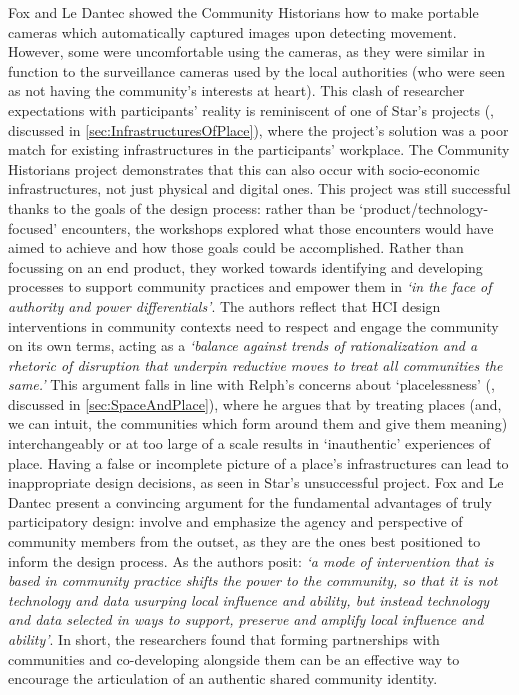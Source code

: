 Fox and Le Dantec showed the Community Historians how to make portable cameras which automatically captured images upon detecting movement. However, some were uncomfortable using the cameras, as they were similar in function to the surveillance cameras used by the local authorities (who were seen as not having the community's interests at heart). This clash of researcher expectations with participants' reality is reminiscent of one of Star's projects (\cite{Star1999}, discussed in \ref{sec:InfrastructuresOfPlace}), where the project's solution was a poor match for existing infrastructures in the participants' workplace. The Community Historians project demonstrates that this can also occur with socio-economic infrastructures, not just physical and digital ones. This project was still successful thanks to the goals of the design process: rather than be `product/technology-focused' encounters, the workshops explored what those encounters would have aimed to achieve and how those goals could be accomplished. Rather than focussing on an end product, they worked towards identifying and developing processes to support community practices and empower them in \textit{`in the face of authority and power differentials'}. The authors reflect that HCI design interventions in community contexts need to respect and engage the community on its own terms, acting as a \textit{`balance against trends of rationalization and a rhetoric of disruption that underpin reductive moves to treat all communities the same.'} This argument falls in line with Relph's concerns about `placelessness' (\cite{Relph1976}, discussed in \ref{sec:SpaceAndPlace}), where he argues that by treating places (and, we can intuit, the communities which form around them and give them meaning) interchangeably or at too large of a scale results in `inauthentic' experiences of place. Having a false or incomplete picture of a place's infrastructures can lead to inappropriate design decisions, as seen in Star's unsuccessful project. Fox and Le Dantec present a convincing argument for the fundamental advantages of truly participatory design: involve and emphasize the agency and perspective of community members from the outset, as they are the ones best positioned to inform the design process. As the authors posit: \textit{`a mode of intervention that is based in community practice shifts the power to the community, so that it is not technology and data usurping local influence and ability, but instead technology and data selected in ways to support, preserve and amplify local influence and ability'}. In short, the researchers found that forming partnerships with communities and co-developing alongside them can be an effective way to encourage the articulation of an authentic shared community identity. 

